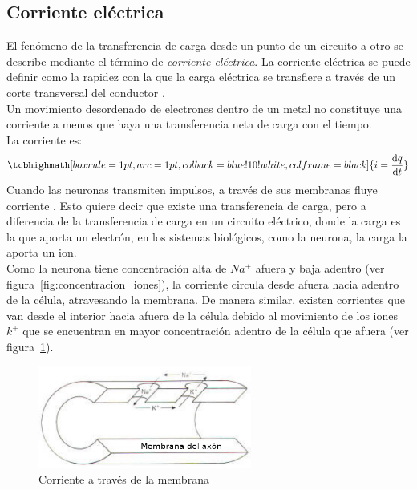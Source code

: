 \subsection{Corriente eléctrica}
El fenómeno de la transferencia de carga desde un punto de un circuito a otro se describe mediante el término de \textit{corriente eléctrica}. La corriente eléctrica se puede definir como la rapidez con la que la carga eléctrica se transfiere a través de un corte transversal del conductor \cite{van1974network}.\\
Un movimiento desordenado de electrones dentro de un metal no constituye una corriente a menos que haya una transferencia neta de carga con el tiempo.\\
La corriente es:
\begin{equation}\label{eq:corriente_def}
    \tcbhighmath[boxrule=1pt,arc=1pt,colback=blue!10!white,colframe=black]{i=\dv{q}{t}}
\end{equation}
Cuando las neuronas transmiten impulsos, a través de sus membranas fluye corriente \cite{cnsclinicwebsite}. Esto quiere decir que existe una transferencia de carga, pero a diferencia de la transferencia de carga en un circuito eléctrico, donde la carga es la que aporta un electrón, en los sistemas biológicos, como la neurona, la carga la aporta un ion.\\
Como la neurona tiene concentración alta de $Na^+$ afuera y baja adentro (ver figura~\ref{fig:concentracion_iones}), la corriente circula desde afuera hacia adentro de la célula, atravesando la membrana. De manera similar, existen corrientes que van desde el interior hacia afuera de la célula debido al movimiento de los iones $k^+$ que se encuentran en mayor concentración adentro de la célula que afuera (ver figura~\ref{fig:corriente_membrana}).
\begin{figure}[htbp!]
    \centering
    \includegraphics[width=7cm]{figures/corriente_membrana.png}
    \caption{Corriente a través de la membrana}
    \label{fig:corriente_membrana}
\end{figure}
